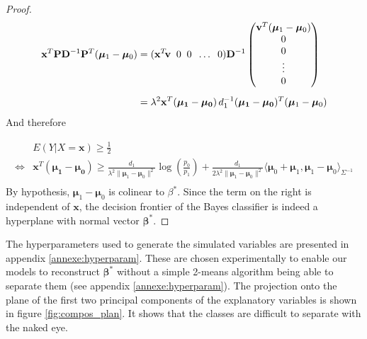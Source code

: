 \documentclass[preprint,12pt]{elsarticle}
\begin{document}
\begin{proof}
\begin{align}
    \mathbf{x}^T\mathbf{P}\mathbf{D}^{-1}\mathbf{P}^T(\bm{\mu}_1 - \bm{\mu}_0) &= (\mathbf{x}^T \hspace{-2 pt}\mathbf{v} \; \; 0 \; \; 0 \; \;\hdots \; \; 0) \mathbf{D}^{-1} \begin{pmatrix}
        \mathbf{v}^T(\bm{\mu}_1 - \bm{\mu}_0) \\
        0 \\
        0 \\
        \vdots \\
        0
        \end{pmatrix}\\[5 pt]
    &= \lambda^2\mathbf{x}^T (\mathbf{\bm{\mu}_1 - \bm{\mu}_0}) \, d_1^{-1} (\mathbf{\bm{\mu}_1 - \bm{\mu}_0})^T(\bm{\mu}_1 - \bm{\mu}_0)
\end{align}
And therefore

\begin{align}
    & E(Y|X = \mathbf{x}) \geq \frac{1}{2}\\[5 pt]
    \iff & \mathbf{x}^T (\mathbf{\bm{\mu}_1 - \bm{\mu}_0})  \geq \frac{d_1}{ \lambda^2\lVert\bm{\mu}_1 - \bm{\mu}_0 \rVert^2}\log\left(\frac{p_0}{p_1} \right) + \frac{d_1}{2 \lambda^2\lVert\bm{\mu}_1 - \bm{\mu}_0 \rVert^2}\langle \bm{\mu}_0 + \bm{\mu}_1 , \bm{\mu}_1 - \bm{\mu}_0\rangle_{\Sigma^{-1}}  \\[5 pt]
\end{align}
By hypothesis, $\bm{\mu}_1 - \bm{\mu}_0$ is colinear to $\beta^*$. Since the term on the right is independent of $\mathbf{x}$, the decision frontier of the Bayes classifier is indeed a hyperplane with normal vector $\bm{\beta}^*$.
\end{proof}

The hyperparameters used to generate the simulated variables are presented in appendix \ref{annexe:hyperparam}. These are chosen experimentally to enable our models to reconstruct $\bm{\beta}^*$ without a simple 2-means algorithm being able to separate them (see appendix \ref{annexe:hyperparam}). The projection onto the plane of the first two principal components of the explanatory variables is shown in figure \ref{fig:compos_plan}. It shows that the classes are difficult to separate with the naked eye.
\end{document}
